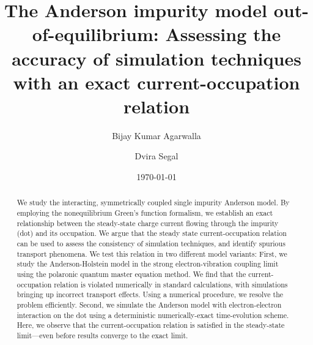 \documentclass[aps,pra,twocolumn,groupedaddress,showpacs,superscriptaddress,amssymb,amsmath]{revtex4-1}
\begin{document}

\title
{The Anderson impurity model out-of-equilibrium: 
Assessing the accuracy of simulation techniques with an exact current-occupation relation}



\author{Bijay Kumar Agarwalla}
\author{Dvira Segal}

\date{\today}

\begin{abstract}
%
We study the interacting, symmetrically coupled single impurity Anderson model.
By employing the nonequilibrium Green's function formalism,
we establish an exact relationship between the 
steady-state charge current flowing through the impurity (dot) and its occupation.
%
We argue that the steady state current-occupation relation can be used to assess the consistency 
of simulation techniques, and identify spurious transport phenomena.
We test this relation in two different model variants:
First, we study the Anderson-Holstein model in the strong electron-vibration coupling limit 
using the polaronic quantum master equation method. 
We find that the current-occupation relation
is violated numerically in standard calculations, with simulations bringing up incorrect
transport effects. Using a numerical procedure, we resolve the problem efficiently.
%
Second, we simulate the Anderson model with electron-electron interaction on the dot
using a deterministic numerically-exact time-evolution scheme. 
Here, we observe that the current-occupation relation is satisfied in the steady-state limit---even before results
converge to the exact limit.
%
%
\end{abstract}
\maketitle
\end{document}
